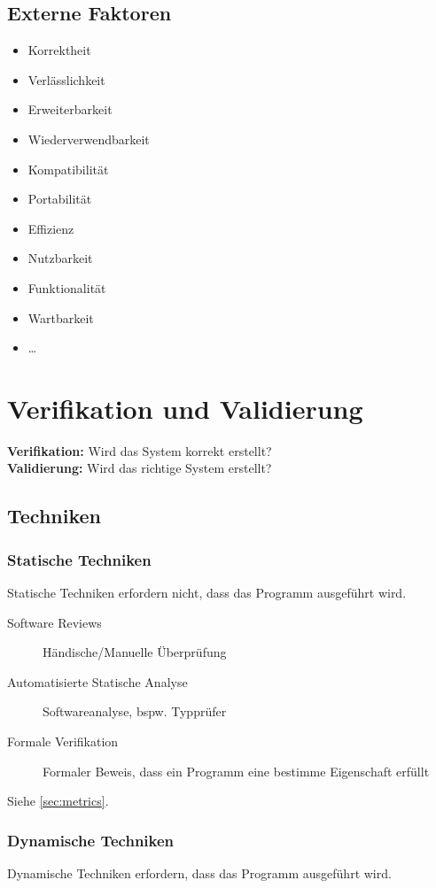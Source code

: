 		\subsection{Externe Faktoren}
			\begin{itemize}
				\item Korrektheit
				\item Verlässlichkeit
				\item Erweiterbarkeit
				\item Wiederverwendbarkeit
				\item Kompatibilität
				\item Portabilität
				\item Effizienz
				\item Nutzbarkeit
				\item Funktionalität
				\item Wartbarkeit
				\item \dots
			\end{itemize}
	
	\section{Verifikation und Validierung}
		\textbf{Verifikation:} Wird das System korrekt erstellt? \\
		\textbf{Validierung:} Wird das richtige System erstellt?
		
		\subsection{Techniken}
			\subsubsection{Statische Techniken}
				Statische Techniken erfordern nicht, dass das Programm ausgeführt wird.
				
				\begin{description}
					\item[Software Reviews] Händische/Manuelle Überprüfung
					\item[Automatisierte Statische Analyse] Softwareanalyse, bspw. Typprüfer
					\item[Formale Verifikation] Formaler Beweis, dass ein Programm eine bestimme Eigenschaft erfüllt
				\end{description}
				
				Siehe \ref{sec:metrics}.
			
			\subsubsection{Dynamische Techniken}
				Dynamische Techniken erfordern, dass das Programm ausgeführt wird.
				
